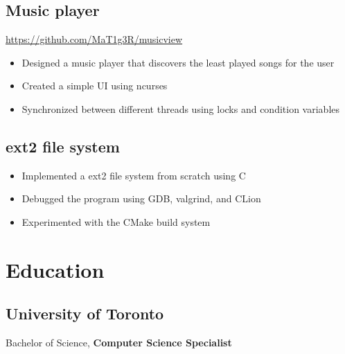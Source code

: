 \documentclass[letterpaper,12pt,oneside]{article}
\newcommand{\smallurl}[1]{\footnotesize{\url{#1}}\normalsize}
\begin{document}
\subsection*{Music player \hfill {}}
\smallurl{https://github.com/MaT1g3R/musicview}
\begin{itemize}
      \setlength\itemsep{0em}
      \item Designed a music player that discovers the least played songs for the user
      \item Created a simple UI using ncurses
      \item Synchronized between different threads using locks and condition variables
\end{itemize}

\subsection*{ext2 file system \hfill {}}
\begin{itemize}
      \setlength\itemsep{0em}
      \item Implemented a ext2 file system from scratch using C
      \item Debugged the program using GDB, valgrind, and CLion
      \item Experimented with the CMake build system
\end{itemize}

\section*{Education}
\subsection*{University of Toronto \hfill {}}
Bachelor of Science, \textbf{Computer Science Specialist}
\end{document}
